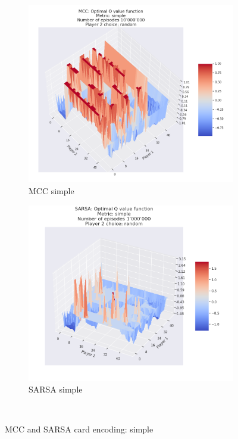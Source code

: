 \begin{figure}[ht!]
    \begin{subfigure}{0.5\textwidth}
        \includegraphics[width=1\linewidth]{Figures/mcc_simple_10000000_random} 
        \caption[MCC simple]{MCC simple}
        \label{fig:mcc simple}
    \end{subfigure}
    \begin{subfigure}{0.5\textwidth}
        \includegraphics[width=1\linewidth]{Figures/SARSA_simple_1000000_random}
        \caption[SARSA simple]{SARSA simple}
        \label{fig:sarsa simple}
    \end{subfigure} \\
    \caption{MCC and SARSA card encoding: simple}
\label{fig:MCC and SARSA card encoding: simple}
\end{figure}

